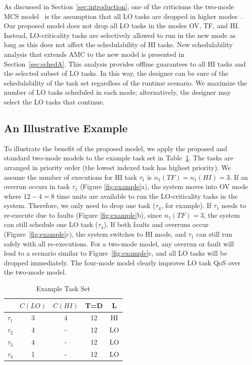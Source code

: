 \documentclass[conference]{IEEEtran}
\begin{document}
As discussed in Section~\ref{sec:introduction}, one of the criticisms the two-mode MCS model~\cite{baruah2011response, pathan14} is the assumption that all LO tasks are dropped in higher modes~\cite{burns2013mixed}. Our proposed model does not drop all LO tasks in the modes OV, TF, and HI. Instead, LO-criticality tasks are selectively allowed to run in the new mode as long as this does not affect the schedulability of HI tasks. New schedulability analysis that extends AMC to the new model is presented in Section~\ref{sec:schedA}. This analysis provides offline guarantees to all HI tasks and the selected subset of LO tasks. In this way, the designer can be sure of the schedulability of the task set regardless of the runtime scenario. We maximize the number of LO tasks scheduled in each mode; alternatively, the designer may select the LO tasks that continue. 


\subsection{An Illustrative Example}

To illustrate the benefit of the proposed model, we apply the proposed and standard two-mode models to the example task set in Table~\ref{t:example}. The tasks are arranged in priority order (the lowest indexed task has highest priority). We assume the number of executions for HI task $\tau_1$ is $n_1(TF)=n_1(HI)=3$. If an overrun occurs in task $\tau_1$ (Figure \ref{fig:example}a), the system moves into OV mode where $12-4=8$ time units are available to run the LO-criticality tasks in the system. Therefore, we only need to drop one task ($\tau_4$, for example). If $\tau_1$ needs to re-execute due to faults (Figure \ref{fig:example}b), since $n_1(TF)=3$, the system can still schedule one LO task ($\tau_4$). If both faults and overruns occur (Figure~\ref{fig:example}c), the system switches to HI mode, and $\tau_1$ can still run safely with all re-executions. For a two-mode model, any overrun or fault will lead to a scenario similar to Figure~\ref{fig:example}c, and all LO tasks will be dropped immediately.  The four-mode model clearly improves LO task QoS over the two-mode model.

\begin{table}[t!]
\caption{Example Task Set}
\centering

	\begin{tabular}{@{}lcccc@{}}
	\toprule
	& $C(LO)$ & $C(HI)$ & T=D & L 	 \\
	\bottomrule
	$\tau_1$ & 3 & 4 & 12 & HI  \\
	$\tau_2$ & 4 & - & 12 & LO  \\
	$\tau_3$ & 4 & - & 12 & LO  \\
	$\tau_4$ & 1 & - & 12 & LO  \\
	\end{tabular}

\label{t:example}
\end{table}
\end{document}
